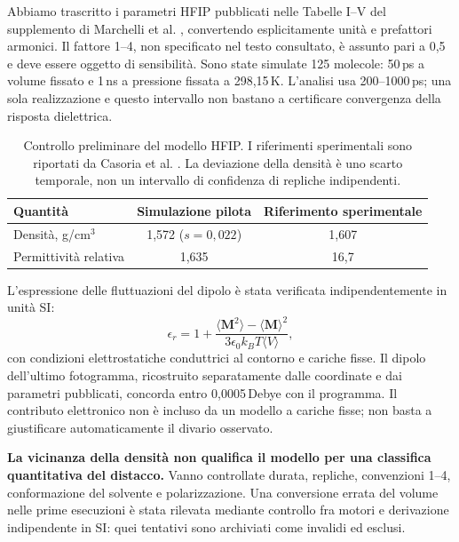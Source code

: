 \documentclass[11pt,reqno]{amsart}
\numberwithin{equation}{section}
\begin{document}
Abbiamo trascritto i parametri HFIP pubblicati nelle Tabelle I--V
del supplemento di Marchelli et al. \cite{Marchelli2022}, convertendo
esplicitamente unit\`a e prefattori armonici. Il fattore 1--4, non
specificato nel testo consultato, \`e assunto pari a 0,5 e deve essere
oggetto di sensibilit\`a. Sono state simulate 125 molecole:
50\,ps a volume fissato e 1\,ns a pressione fissata a 298,15\,K.
L'analisi usa 200--1000\,ps; una sola realizzazione e questo intervallo
non bastano a certificare convergenza della risposta dielettrica.

\begin{table}[htbp]\centering
\caption{Controllo preliminare del modello HFIP. I riferimenti
sperimentali sono riportati da Casoria et al. \cite{Casoria2024}.
La deviazione della densit\`a \`e uno scarto temporale, non un
intervallo di confidenza di repliche indipendenti.}
\begin{tabular}{lcc}\toprule
Quantit\`a & Simulazione pilota & Riferimento sperimentale\\\midrule
Densit\`a, g/cm$^3$ & 1,572 ($s=0,022$) & 1,607\\
Permittivit\`a relativa & 1,635 & 16,7\\\bottomrule
\end{tabular}
\end{table}

L'espressione delle fluttuazioni del dipolo \`e stata verificata
indipendentemente in unit\`a SI:
\begin{equation}
 \epsilon_r=1+\frac{\langle\mathbf M^2\rangle
                         -\langle\mathbf M\rangle^2}
                       {3\epsilon_0 k_B T\langle V\rangle},
\end{equation}
con condizioni elettrostatiche conduttrici al contorno e cariche fisse.
Il dipolo dell'ultimo fotogramma, ricostruito separatamente dalle
coordinate e dai parametri pubblicati, concorda entro
0,0005\,Debye con il programma. Il contributo elettronico non \`e
incluso da un modello a cariche fisse; non basta a giustificare
automaticamente il divario osservato.

\textbf{La vicinanza della densit\`a non qualifica il modello per
una classifica quantitativa del distacco.} Vanno controllate durata,
repliche, convenzioni 1--4, conformazione del solvente e polarizzazione.
Una conversione errata del volume nelle prime esecuzioni \`e stata
rilevata mediante controllo fra motori e derivazione indipendente
in SI: quei tentativi sono archiviati come invalidi ed esclusi.
\end{document}
